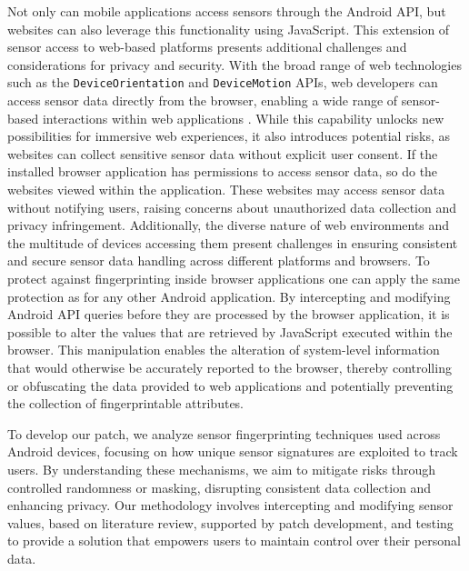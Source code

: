 \documentclass[11pt,
  oneside,openany,    %
]{scrreprt}
\begin{document}
Not only can mobile applications access sensors through the Android API, but websites can also leverage this functionality using JavaScript.
This extension of sensor access to web-based platforms presents additional challenges and considerations for privacy and security.
With the broad range of web technologies such as the \verb|DeviceOrientation| and \verb|DeviceMotion| APIs, web developers can access sensor data directly from the browser, enabling a wide range of sensor-based interactions within web applications \cite{DBLP:journals/popets/DasBC18}.
While this capability unlocks new possibilities for immersive web experiences, it also introduces potential risks, as websites can collect sensitive sensor data without explicit user consent.
If the installed browser application has permissions to access sensor data, so do the websites viewed within the application.
These websites may access sensor data without notifying users, raising concerns about unauthorized data collection and privacy infringement.
Additionally, the diverse nature of web environments and the multitude of devices accessing them present challenges in ensuring consistent and secure sensor data handling across different platforms and browsers.
To protect against fingerprinting inside browser applications one can apply the same protection as for any other Android application.
By intercepting and modifying Android API queries before they are processed by the browser application, it is possible to alter the values that are retrieved by JavaScript executed within the browser.
This manipulation enables the alteration of system-level information that would otherwise be accurately reported to the browser, thereby controlling or obfuscating the data provided to web applications and potentially preventing the collection of fingerprintable attributes.

To develop our patch, we analyze sensor fingerprinting techniques used across Android devices, focusing on how unique sensor signatures are exploited to track users.
By understanding these mechanisms, we aim to mitigate risks through controlled randomness or masking, disrupting consistent data collection and enhancing privacy.
Our methodology involves intercepting and modifying sensor values, based on literature review, supported by patch development, and testing to provide a solution that empowers users to maintain control over their personal data.
\end{document}
